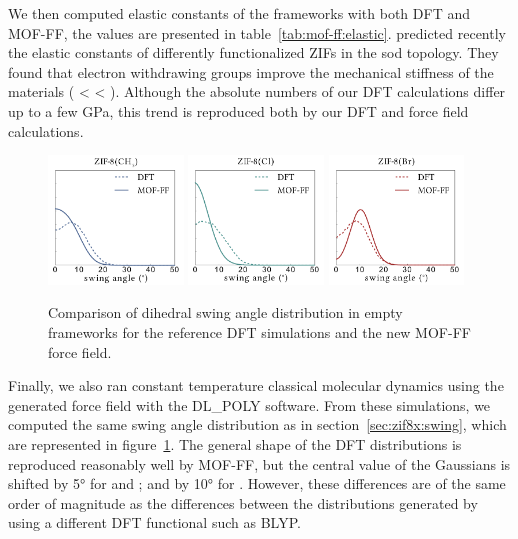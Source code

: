 \documentclass[thesis]{subfiles}
\begin{document}
We then computed elastic constants of the frameworks with both DFT and MOF-FF,
the values are presented in table~\ref{tab:mof-ff:elastic}.
\citeauthor{Zheng2017} predicted recently the elastic constants of differently
functionalized ZIFs in the sod topology\cite{Zheng2017}. They found that
electron withdrawing groups improve the mechanical stiffness of the materials
( < \ZIFCl < \ZIFBr). Although the absolute numbers of our DFT
calculations differ up to a few \si{GPa}, this trend is reproduced both by our
DFT and force field calculations.

\begin{figure}[ht]
    \centering
    \includegraphics[width=0.32\textwidth]{figures/images/mof-ff-dihedrals-CH3}
    \includegraphics[width=0.32\textwidth]{figures/images/mof-ff-dihedrals-Cl}
    \includegraphics[width=0.32\textwidth]{figures/images/mof-ff-dihedrals-Br}
    \caption{Comparison of dihedral swing angle distribution in empty frameworks
    for the reference DFT simulations and the new MOF-FF force field.}
    \label{fig:fig:mof-ff:swing}
\end{figure}

Finally, we also ran constant temperature classical molecular dynamics using the
generated force field with the DL\_POLY software. From these simulations, we
computed the same swing angle distribution as in section~\ref{sec:zif8x:swing},
which are represented in figure~\ref{fig:fig:mof-ff:swing}. The general shape of
the DFT distributions is reproduced reasonably well by MOF-FF, but the central
value of the Gaussians is shifted by 5° for \ZIFCl and \ZIFBr; and by 10° for
. However, these differences are of the same order of magnitude as the
differences between the distributions generated by using a different DFT
functional such as BLYP\cite{Coudert2017}.
\end{document}
